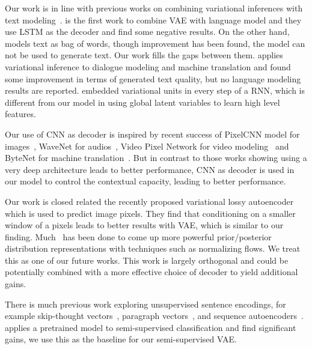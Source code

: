 \documentclass{article}
\begin{document}
Our work is in line with previous works on combining variational inferences
with text
modeling~\cite{bowman2015generating,miao2016neural,serban2016hierarchical,
  zhang2016variational, hu2017controllable}. \cite{bowman2015generating} is the first work to
combine VAE with language model and they use LSTM as the decoder and find some
negative results. On the other hand, \cite{miao2016neural} models text as bag
of words, though improvement has been found, the model can not be used to
generate text.  Our work fills the gaps between
them. \cite{serban2016hierarchical, zhang2016variational} applies variational
inference to dialogue modeling and machine translation and found some
improvement in terms of generated text quality, but no language modeling
results are
reported. \cite{chung2015recurrent,bayer2014learning,fraccaro2016sequential}
embedded variational units in every step of a RNN, which is different from our model
in using global latent variables to learn high level features.

Our use of CNN as decoder is inspired by recent success of PixelCNN model for
images~\cite{van2016conditional}, WaveNet for audios~\cite{van2016wavenet},
Video Pixel Network for video modeling~\cite{kalchbrenner2016video} and ByteNet
for machine translation~\cite{kalchbrenner2016neural}. But in contrast to those
works showing using a very deep architecture leads to better performance, CNN
as decoder is used in our model to control the contextual capacity, leading to better performance.

Our work is closed related the recently proposed variational lossy
autoencoder~\cite{chen2016variational} which is used to predict image
pixels. They find that conditioning on a smaller window of a pixels leads to better
results with VAE, which is similar to our finding.
Much~\cite{rezende2015variational, kingma2016improving, chen2016variational} has been done to
come up more powerful prior/posterior distribution representations with techniques such as
normalizing flows. We treat this as one of our future works.
This work is largely orthogonal and could be potentially
combined with a more effective choice of decoder to yield additional gains.

There is much previous work exploring unsupervised sentence encodings, for example
skip-thought vectors~\cite{kiros2015skip}, paragraph
vectors~\cite{le2014distributed}, and sequence
autoencoders~\cite{dai2015semi}. \cite{dai2015semi} applies a pretrained
model to semi-supervised classification and find significant gains, we use this
as the baseline for our semi-supervised VAE.
\end{document}

